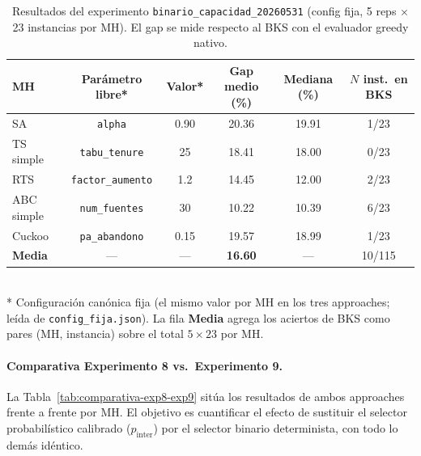 \begin{table}[h]
\centering
\caption{Resultados del experimento \texttt{binario\_capacidad\_20260531}
         (config fija, 5 reps $\times$ 23 instancias por MH). El gap se mide
         respecto al BKS con el evaluador greedy nativo.}
\label{tab:binario-capacidad-resultados}
\small
\begin{tabular}{lccccc}
\toprule
MH & Parámetro libre* & Valor* &
  Gap medio (\%) & Mediana (\%) & $N$ inst.\ en BKS \\
\midrule
SA           & \texttt{alpha}           & 0.90 &
  20.36 & 19.91 & 1/23 \\
TS simple    & \texttt{tabu\_tenure}    & 25   &
  18.41 & 18.00 & 0/23 \\
RTS          & \texttt{factor\_aumento} & 1.2  &
  14.45 & 12.00 & 2/23 \\
ABC simple   & \texttt{num\_fuentes}    & 30   &
  10.22 & 10.39 & 6/23 \\
Cuckoo       & \texttt{pa\_abandono}    & 0.15 &
  19.57 & 18.99 & 1/23 \\
\midrule
\textbf{Media} & --- & --- & \textbf{16.60} & --- & 10/115 \\
\bottomrule
\end{tabular}
\\[4pt]
\footnotesize
* Configuración canónica fija (el mismo valor por MH en los tres approaches;
leída de \texttt{config\_fija.json}). La fila \textbf{Media} agrega los aciertos
de BKS como pares (MH, instancia) sobre el total $5 \times 23$ por MH.
\end{table}

\paragraph{Comparativa Experimento 8 vs.\ Experimento 9.}
La Tabla~\ref{tab:comparativa-exp8-exp9} sitúa los resultados de ambos
approaches frente a frente por MH. El objetivo es cuantificar el efecto
de sustituir el selector probabilístico calibrado ($p_{\text{inter}}$)
por el selector binario determinista, con todo lo demás idéntico.


